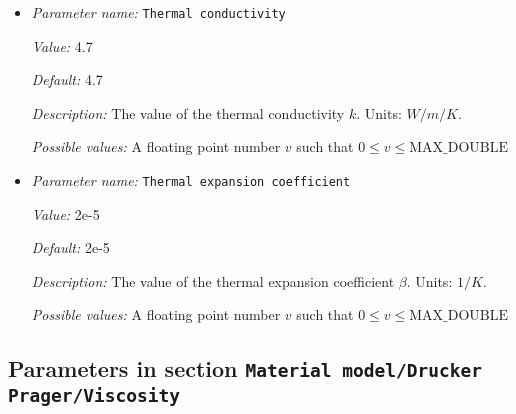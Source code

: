 \begin{itemize}
For problems with a constant viscosity, you will generally want to choose the reference viscosity equal to the actual viscosity. For problems with a variable viscosity, the reference viscosity should be a value that adequately represents the order of magnitude of the viscosities that appear, such as an average value or the value one would use to compute a Rayleigh number.

Units: $Pa \, s$


{\it Possible values:} A floating point number $v$ such that $0 \leq v \leq \text{MAX\_DOUBLE}$
\item {\it Parameter name:} {\tt Thermal conductivity}
\label{parameters:Material model/Drucker Prager/Thermal conductivity}


{\it Value:} 4.7


{\it Default:} 4.7


{\it Description:} The value of the thermal conductivity $k$. Units: $W/m/K$.


{\it Possible values:} A floating point number $v$ such that $0 \leq v \leq \text{MAX\_DOUBLE}$
\item {\it Parameter name:} {\tt Thermal expansion coefficient}
\label{parameters:Material model/Drucker Prager/Thermal expansion coefficient}


{\it Value:} 2e-5


{\it Default:} 2e-5


{\it Description:} The value of the thermal expansion coefficient $\beta$. Units: $1/K$.


{\it Possible values:} A floating point number $v$ such that $0 \leq v \leq \text{MAX\_DOUBLE}$
\end{itemize}



\subsection{Parameters in section \tt Material model/Drucker Prager/Viscosity}
\label{parameters:Material_20model/Drucker_20Prager/Viscosity}

